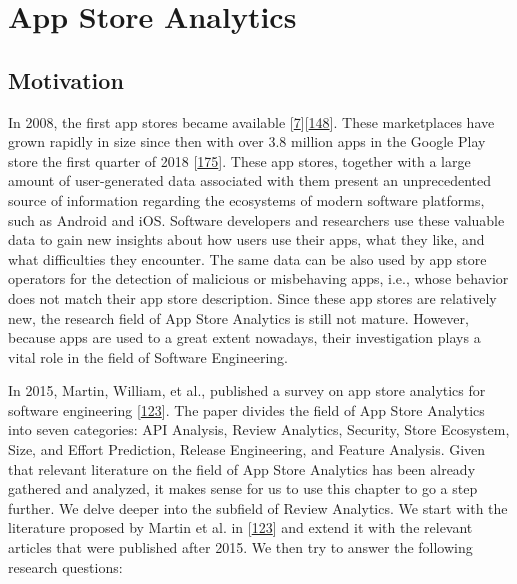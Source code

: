 \documentclass[]{book}
\begin{document}
\chapter{App Store Analytics}\label{app-store-analytics}

\section{Motivation}\label{motivation-6}

In 2008, the first app stores became available
{[}\protect\hyperlink{ref-appStoreLaunch}{7}{]}{[}\protect\hyperlink{ref-androidMarketLaunch}{148}{]}.
These marketplaces have grown rapidly in size since then with over 3.8
million apps in the Google Play store the first quarter of 2018
{[}\protect\hyperlink{ref-appNumber}{175}{]}. These app stores, together
with a large amount of user-generated data associated with them present
an unprecedented source of information regarding the ecosystems of
modern software platforms, such as Android and iOS. Software developers
and researchers use these valuable data to gain new insights about how
users use their apps, what they like, and what difficulties they
encounter. The same data can be also used by app store operators for the
detection of malicious or misbehaving apps, i.e., whose behavior does
not match their app store description. Since these app stores are
relatively new, the research field of App Store Analytics is still not
mature. However, because apps are used to a great extent nowadays, their
investigation plays a vital role in the field of Software Engineering.

In 2015, Martin, William, et al., published a survey on app store
analytics for software engineering
{[}\protect\hyperlink{ref-martin2015survey}{123}{]}. The paper divides
the field of App Store Analytics into seven categories: API Analysis,
Review Analytics, Security, Store Ecosystem, Size, and Effort
Prediction, Release Engineering, and Feature Analysis. Given that
relevant literature on the field of App Store Analytics has been already
gathered and analyzed, it makes sense for us to use this chapter to go a
step further. We delve deeper into the subfield of Review Analytics. We
start with the literature proposed by Martin et al. in
{[}\protect\hyperlink{ref-martin2015survey}{123}{]} and extend it with
the relevant articles that were published after 2015. We then try to
answer the following research questions:
\end{document}
